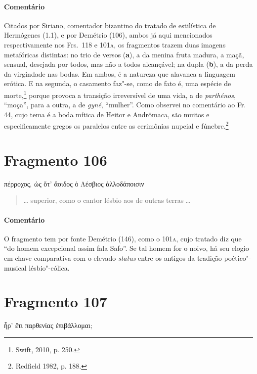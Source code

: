 {\paragraph{Comentário} Citados por Siriano, comentador bizantino do tratado de estilística de
Hermógenes (1.1), e por Demétrio (106), ambos já aqui mencionados respectivamente nos Frs.~118 e 101\textsc{a}, os fragmentos trazem duas imagens metafóricas distintas: no trio de versos (\textbf{a}), a da menina fruta madura, a maçã, sensual, desejada por todos,
mas não a todos alcançável; na dupla (\textbf{b}), a da perda da virgindade nas bodas.
Em ambos, é a natureza que alavanca a linguagem erótica.
E na segunda, o casamento faz"-se, como de fato é, uma espécie de morte,\footnote{Swift, 2010, p. 250.} porque provoca a transição irreversível de uma vida, a de \textit{parthénos}, ``moça'', para a outra, a de \textit{gyné}, ``mulher''. Como observei no comentário ao Fr.\,44, cujo tema é a boda mítica de Heitor e Andrômaca, são muitos e especificamente gregos os paralelos entre as cerimônias nupcial e fúnebre.\footnote{Redfield 1982, p. 188.}


\pagebreak
\section{Fragmento 106}

\begin{gkverse}
πέρροχος, ὠς ὄτ’ ἄοιδος ὀ Λέσβιος ἀλλοδάποισιν
\end{gkverse}

\begin{verse}
\ldots{} superior, como o cantor lésbio aos de outras terras \ldots{}
\end{verse}

\medskip

{\paragraph{Comentário} O fragmento tem por fonte Demétrio (146), como o 101\textsc{a}, cujo tratado diz que
``do homem excepcional assim fala Safo''. Se tal homem for o
noivo, há seu elogio em chave comparativa com o elevado \textit{status}
entre os antigos da tradição poético"-musical lésbio"-eólica.}


\section{Fragmento 107}

\begin{gkverse}
ἦρ’ ἔτι παρθενίας ἐπιβάλλομαι;
\end{gkverse}

}
